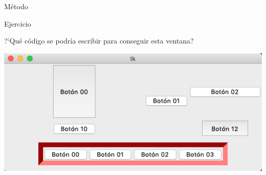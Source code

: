 \documentclass[10pt, envcountsect , spanish]{beamer}
\begin{document}
\begin{frame}{Método }
\begin{itemize}
\end{itemize}


\end{frame}


\begin{frame}{Ejercicio} 

\begin{ejercicio}{}
?`Qué código se podría escribir para conseguir esta ventana?


\centerline{\includegraphics[width=.75\textwidth]{fig/ejercicioGrid}}



\end{ejercicio}

\end{frame}
\end{document}
